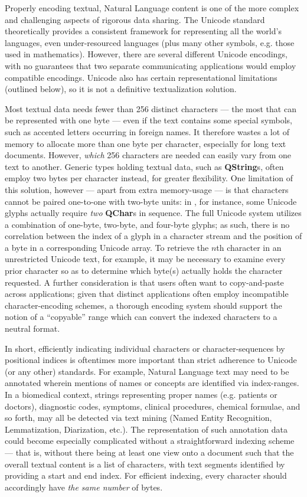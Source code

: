 \documentclass[12pt,letterpaper]{article}
\newcommand{\textscc}[1]{{\color{orr!35!black}{{%
{\textsc{\textbf{#1}}}}}}}
\newcommand{\AcronymText}[1]{{\textscc{#1}}}
\newcommand{\Qt}{\resizebox{!}{8pt}{\AcronymText{Qt}}}
\newcommand{\p}[1]{

\vspace{.7em}#1}
\newcommand{\q}[1]{{\fontfamily{qcr}\selectfont ``}#1{\fontfamily{qcr}\selectfont ''}}
\begin{document}
{\p{Properly encoding textual, Natural Language content is 
one of the more complex and challenging aspects of 
rigorous data sharing.  The Unicode standard theoretically 
provides a consistent framework for representing all 
the world's languages, even under-resourced languages 
(plus many other symbols, e.g. 
those used in mathematics).  However, there are 
several different Unicode encodings, with no guarantees 
that two separate communicating applications would employ 
compatible encodings.  Unicode also has certain 
representational limitations (outlined below), 
so it is not a definitive textualization solution.}

\p{Most textual data needs fewer than 256 distinct characters 
--- the most that can be represented with one byte --- even 
if the text contains some special symbols, such as accented 
letters occurring in foreign names.  It therefore wastes 
a lot of memory to allocate more than one byte per character, 
especially for long text documents.  However, \textit{which} 
256 characters are needed can easily vary from one text to 
another.  Generic types holding textual data, such as 
\textbf{QString}s, often employ two bytes per character instead, 
for greater flexibility.  One limitation of this solution, 
however --- apart from extra memory-usage --- is that 
characters cannot be paired one-to-one with two-byte 
units: in \Qt{}, for instance, some Unicode glyphs 
actually require \textit{two} \textbf{QChar}s in sequence.  
The full Unicode system utilizes a combination of one-byte, 
two-byte, and four-byte glyphs; as such, there is no 
correlation between the index of a glyph in a character 
stream and the position of a byte in a corresponding 
Unicode array.  To retrieve the $n$th character in an 
unrestricted Unicode text, for example, it may be 
necessary to examine every prior character so as to 
determine which byte(s) actually holds the character 
requested.  A further consideration is that users often 
want to copy-and-paste across applications; given 
that distinct applications often employ incompatible 
character-encoding schemes, a thorough encoding system should 
support the notion of a \q{copyable} range which can convert 
the indexed characters to a neutral format.}

\p{In short, efficiently indicating individual 
characters or character-sequences by positional indices is 
oftentimes more important than strict adherence to Unicode (or any other) 
standards.  For example, Natural Language text may need 
to be annotated wherein mentions of names or concepts 
are identified via index-ranges.  In a biomedical 
context, strings representing proper names (e.g. patients or 
doctors), diagnostic codes, symptoms, clinical 
procedures, chemical formulae, and so forth, may all 
be detected via text mining (Named Entity Recognition, 
Lemmatization, Diarization, etc.).  
The representation of such annotation data could become especially  
complicated without a straightforward indexing scheme 
--- that is, without there being at least one view onto a document 
such that the overall textual content is a list of characters, 
with text segments identified by providing a start and 
end index.  For efficient indexing, every character should 
accordingly have \textit{the same number} of bytes.} 

}
\end{document}
